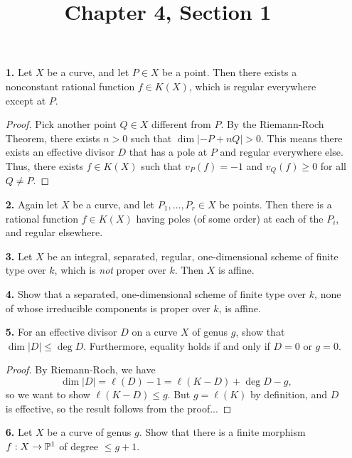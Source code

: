 \documentclass{article}
\title{Chapter 4, Section 1}
\begin{document}
\maketitle
\begin{enumerate} [label=\textbf{\arabic*.}, leftmargin=0em]

\item[\textbf{1.}] Let $X$ be a curve, and let $P \in X$ be a point.
Then there exists a nonconstant  rational function $f \in K(X)$, which is regular everywhere except at $P$.

\begin{proof}
  Pick another point $Q \in X$ different from $P$.
  By the Riemann-Roch Theorem, there exists $n > 0$ such that $\dim|-P + nQ| > 0$.
  This means there exists an effective divisor $D$ that has a pole at $P$ and regular everywhere else.
  Thus, there exists $f \in K(X)$ such that $v_P(f) = -1$ and $v_Q(f) \geq 0$ for all $Q \neq P$.
\end{proof}

\item[\textbf{2.}] Again let $X$ be a curve, and let $P_1, \dots, P_r \in X$ be points.
Then there is a rational function $f \in K(X)$ having poles (of some order) at each of the $P_i$, and regular elsewhere.

\item[\textbf{3.}] Let $X$ be an integral, separated, regular, one-dimensional scheme of finite type over $k$, which is \textit{not} proper over $k$.
Then $X$ is affine.

\item[\textbf{4.}] Show that a separated, one-dimensional scheme of finite type over $k$, none of whose irreducible components is proper over $k$, is affine.

\item[\textbf{5.}] For an effective divisor $D$ on a curve $X$ of genus $g$, show that $\dim{|D|} \leq \deg{D}$. Furthermore, equality holds if and only if $D = 0$ or $g = 0$.

\begin{proof}
  By Riemann-Roch, we have
  \begin{equation*}
    \dim{|D|} = \ell(D) - 1 = \ell(K - D) + \deg{D} - g,
  \end{equation*}
  so we want to show $\ell(K - D) \leq g$. But $g = \ell(K)$ by definition, and $D$ is effective, so the result follows from the proof...
\end{proof}

\item[\textbf{6.}] Let $X$ be a curve of genus $g$.
Show that there is a finite morphism $f : X \to \mathbb{P}^1$ of degree $\leq g + 1$.


\end{enumerate}
\end{document}
